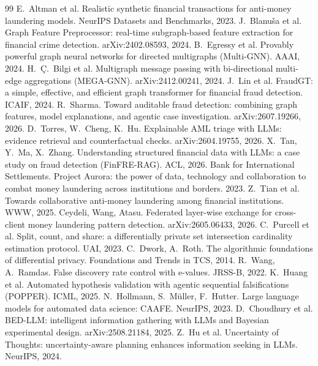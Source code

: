 \documentclass[11pt,a4paper]{article}
\begin{document}
\small
\begin{thebibliography}{99}\setlength{\itemsep}{1pt}
 E.~Altman et al. Realistic synthetic financial transactions for anti-money laundering models. NeurIPS Datasets and Benchmarks, 2023.
 J.~Blanu\v{s}a et al. Graph Feature Preprocessor: real-time subgraph-based feature extraction for financial crime detection. arXiv:2402.08593, 2024.
 B.~Egressy et al. Provably powerful graph neural networks for directed multigraphs (Multi-GNN). AAAI, 2024.
 H.~\c{C}.~Bilgi et al. Multigraph message passing with bi-directional multi-edge aggregations (MEGA-GNN). arXiv:2412.00241, 2024.
 J.~Lin et al. FraudGT: a simple, effective, and efficient graph transformer for financial fraud detection. ICAIF, 2024.
 R.~Sharma. Toward auditable fraud detection: combining graph features, model explanations, and agentic case investigation. arXiv:2607.19266, 2026.
 D.~Torres, W.~Cheng, K.~Hu. Explainable AML triage with LLMs: evidence retrieval and counterfactual checks. arXiv:2604.19755, 2026.
 X.~Tan, Y.~Ma, X.~Zhang. Understanding structured financial data with LLMs: a case study on fraud detection (FinFRE-RAG). ACL, 2026.
 Bank for International Settlements. Project Aurora: the power of data, technology and collaboration to combat money laundering across institutions and borders. 2023.
 Z.~Tian et al. Towards collaborative anti-money laundering among financial institutions. WWW, 2025.
 Ceydeli, Wang, Atasu. Federated layer-wise exchange for cross-client money laundering pattern detection. arXiv:2605.06433, 2026.
 C.~Purcell et al. Split, count, and share: a differentially private set intersection cardinality estimation protocol. UAI, 2023.
 C.~Dwork, A.~Roth. The algorithmic foundations of differential privacy. Foundations and Trends in TCS, 2014.
 R.~Wang, A.~Ramdas. False discovery rate control with e-values. JRSS-B, 2022.
 K.~Huang et al. Automated hypothesis validation with agentic sequential falsifications (POPPER). ICML, 2025.
 N.~Hollmann, S.~M\"uller, F.~Hutter. Large language models for automated data science: CAAFE. NeurIPS, 2023.
 D.~Choudhury et al. BED-LLM: intelligent information gathering with LLMs and Bayesian experimental design. arXiv:2508.21184, 2025.
 Z.~Hu et al. Uncertainty of Thoughts: uncertainty-aware planning enhances information seeking in LLMs. NeurIPS, 2024.

\end{thebibliography}
\end{document}
